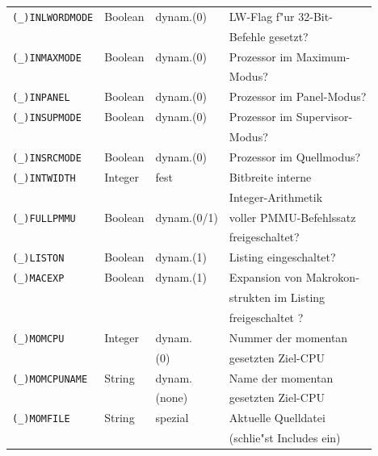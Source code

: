 \documentclass[12pt,a4paper,twoside]{report}
\newcommand{\predefsym}[1]{{\tt (\_)#1}}
\begin{document}
\begin{center}
\begin{longtable}{|l|l|l|l|}
\hline
\predefsym{INLWORDMODE} & Boolean    & dynam.(0)  & LW-Flag f"ur 32-Bit- \\
                       &             &            & Befehle gesetzt? \\
\hline
\predefsym{INMAXMODE}  &  Boolean    & dynam.(0)  & Prozessor im Maximum- \\
                       &             &            & Modus? \\
\hline
\predefsym{INPANEL}    &  Boolean    & dynam.(0)  & Prozessor im Panel-Modus? \\
\hline
\predefsym{INSUPMODE}  &  Boolean    & dynam.(0)  & Prozessor im Supervisor- \\
                       &             &            & Modus? \\
\hline
\predefsym{INSRCMODE}  &  Boolean    & dynam.(0)  & Prozessor im Quellmodus? \\
\hline
\predefsym{INTWIDTH}   &  Integer    & fest       & Bitbreite interne \\
                       &             &            & Integer-Arithmetik \\
\hline
\predefsym{FULLPMMU}   &  Boolean    & dynam.(0/1) & voller PMMU-Befehlssatz \\
                       &             &             & freigeschaltet? \\
\hline
\predefsym{LISTON}     &  Boolean    & dynam.(1)  & Listing eingeschaltet? \\
\hline
\predefsym{MACEXP}     &  Boolean    & dynam.(1)  & Expansion von Makrokon- \\
                       &             &            & strukten im Listing \\
                       &             &            & freigeschaltet ? \\
\hline
\predefsym{MOMCPU}     &  Integer    & dynam.     & Nummer der momentan \\
                       &             & (0)        & gesetzten Ziel-CPU \\
\hline
\predefsym{MOMCPUNAME} &  String     & dynam.     & Name der momentan \\
                       &             & (none)     & gesetzten Ziel-CPU \\
\hline
\predefsym{MOMFILE}    &  String     & spezial    & Aktuelle Quelldatei \\
                       &             &            & (schlie"st Includes ein) \\

\end{longtable}
\end{center}
\end{document}
